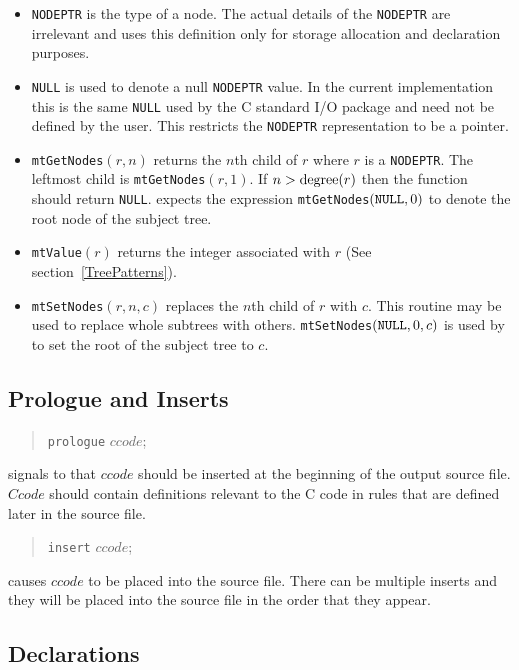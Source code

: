 \begin{itemize}
\item {\tt NODEPTR} is the type of a node.  The actual
details of
the {\tt NODEPTR}
are irrelevant and \twigcomp{} uses this definition only for storage
allocation and declaration purposes.
\item
{\tt NULL} is used to denote a null {\tt NODEPTR} value.
In the current implementation this is the same {\tt NULL} used by the
C standard I/O package and need not be defined by the user.
This restricts the {\tt NODEPTR} representation to be a pointer.
\item
{\tt mtGetNodes$(r,n)$} returns the $n$th child of $r$ where $r$
is a {\tt NODEPTR}.  The
leftmost child is {\tt mtGetNodes}$(r,1)$.  If $n > \hbox{degree}(r)$
then the function should return {\tt NULL}.  \Twigcomp{} expects the
expression {\tt mtGetNodes}$({\tt NULL}, 0)$
to denote the root node of
the subject tree.
\item
{\tt mtValue$(r)$} returns the integer associated with $r$
(See section~\ref{TreePatterns}).
\item
{\tt mtSetNodes$(r,n,c)$} replaces the $n$th child of $r$ with
$c$.  This routine may be used to replace whole subtrees with others.
{\tt mtSetNodes}$({\tt NULL},0,c)$ is used by \twigcomp{} to set the
root of the subject tree to $c$.
\end{itemize}

\subsection{Prologue and Inserts}

\begin{verse}
{\tt prologue} $ccode$;
\end{verse}

\noindent signals to \twigcomp{} that $ccode$ should be inserted at the
beginning of the output source file.  $Ccode$ should contain
definitions relevant to the C code in
rules that are defined later in the \twiglang{} source file.

\begin{verse}
{\tt insert} $ccode$;
\end{verse}

\noindent causes $ccode$ to be placed into the source file.
There can be multiple inserts and they will be placed into the source
file
in the order that they appear.

\subsection{Declarations}

